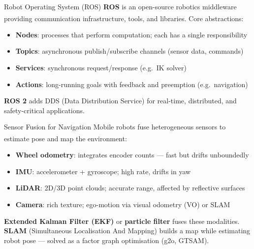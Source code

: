 \begin{v3topic}{Robot Operating System (ROS)}
    \textbf{ROS} is an open-source robotics middleware providing communication infrastructure, tools, and libraries\textsuperscript{\cite[][pp.~1309--1322]{sicilianoSpringerHandbookRobotics2016}}.
    Core abstractions:
    \begin{itemize}
        \item \textbf{Nodes}: processes that perform computation; each has a single responsibility
        \item \textbf{Topics}: asynchronous publish/subscribe channels (sensor data, commands)
        \item \textbf{Services}: synchronous request/response (e.g.\ IK solver)
        \item \textbf{Actions}: long-running goals with feedback and preemption (e.g.\ navigation)
    \end{itemize}
    \textbf{ROS 2} adds DDS (Data Distribution Service) for real-time, distributed, and safety-critical applications.

\end{v3topic}
\begin{v3topic}{Sensor Fusion for Navigation}
    Mobile robots fuse heterogeneous sensors to estimate pose and map the environment\textsuperscript{\cite[][pp.~80--100]{benariElementsRobotics2017}}:
    \begin{itemize}
        \item \textbf{Wheel odometry}: integrates encoder counts — fast but drifts unboundedly
        \item \textbf{IMU}: accelerometer + gyroscope; high rate, drifts in yaw
        \item \textbf{LiDAR}: 2D/3D point clouds; accurate range, affected by reflective surfaces
        \item \textbf{Camera}: rich texture; ego-motion via visual odometry (VO) or SLAM
    \end{itemize}
    \textbf{Extended Kalman Filter (EKF)} or \textbf{particle filter} fuses these modalities.
    \textbf{SLAM} (Simultaneous Localisation And Mapping) builds a map while estimating robot pose --- solved as a factor graph optimisation (g2o, GTSAM).

\end{v3topic}
